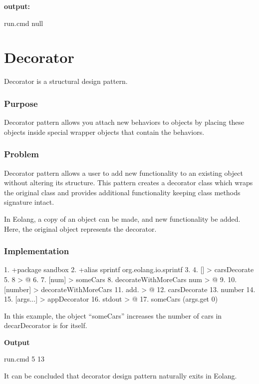 \documentclass[12pt]{book}
\begin{document}
\textbf{output:}


run.cmd
null

\section{Decorator}
Decorator is a structural design pattern.

\subsubsection{Purpose}
Decorator pattern allows you attach new behaviors to objects by placing these objects inside special wrapper objects that contain the behaviors.

\subsubsection{Problem}
Decorator pattern allows a user to add new functionality to an existing object without altering its structure. This pattern creates a decorator class which wraps the original class and provides additional functionality keeping class methods signature intact.


In Eolang, a copy of an object can be made, and new functionality be added. Here, the original object represents the decorator.

\subsubsection{Implementation}
\begin{ffcode}
1.	+package sandbox
2.	+alias sprintf org.eolang.io.sprintf
3.	
4.	[] > carsDecorate
5.	  8 > @
6.	
7.	[num] > someCars
8.	   decorateWithMoreCars num > @
9.	
10.	   [number] > decorateWithMoreCars
11.	     add. > @
12.	       carsDecorate
13.	       number
14.	
15.	[args...] > appDecorator
16.	  stdout > @
17.	    someCars (args.get 0) 

\end{ffcode}

In this example, the object “someCars” increases the number of cars in decarDecorator is for itself.

\textbf{Output}


run.cmd 5
13

It can be concluded that decorator design pattern naturally exits in Eolang.
\end{document}
